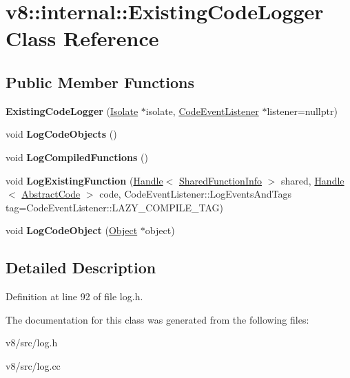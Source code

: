 \hypertarget{classv8_1_1internal_1_1ExistingCodeLogger}{}\section{v8\+:\+:internal\+:\+:Existing\+Code\+Logger Class Reference}
\label{classv8_1_1internal_1_1ExistingCodeLogger}
\subsection*{Public Member Functions}
\begin{DoxyCompactItemize}
\item 
\mbox{\label{classv8_1_1internal_1_1ExistingCodeLogger_a0eab384f0cb423738404a43ff8aeb2e1}} 
{\bfseries Existing\+Code\+Logger} (\mbox{\hyperlink{classv8_1_1internal_1_1Isolate}{Isolate}} $\ast$isolate, \mbox{\hyperlink{classv8_1_1internal_1_1CodeEventListener}{Code\+Event\+Listener}} $\ast$listener=nullptr)
\item 
\mbox{\label{classv8_1_1internal_1_1ExistingCodeLogger_a4f13827550df7915ea06d6f3f60297c3}} 
void {\bfseries Log\+Code\+Objects} ()
\item 
\mbox{\label{classv8_1_1internal_1_1ExistingCodeLogger_ad94e8c20095d9a31a39c855facba5915}} 
void {\bfseries Log\+Compiled\+Functions} ()
\item 
\mbox{\label{classv8_1_1internal_1_1ExistingCodeLogger_aff6921a11138603f3344f5a438f01eb9}} 
void {\bfseries Log\+Existing\+Function} (\mbox{\hyperlink{classv8_1_1internal_1_1Handle}{Handle}}$<$ \mbox{\hyperlink{classv8_1_1internal_1_1SharedFunctionInfo}{Shared\+Function\+Info}} $>$ shared, \mbox{\hyperlink{classv8_1_1internal_1_1Handle}{Handle}}$<$ \mbox{\hyperlink{classv8_1_1internal_1_1AbstractCode}{Abstract\+Code}} $>$ code, Code\+Event\+Listener\+::\+Log\+Events\+And\+Tags tag=Code\+Event\+Listener\+::\+L\+A\+Z\+Y\+\_\+\+C\+O\+M\+P\+I\+L\+E\+\_\+\+T\+AG)
\item 
\mbox{\label{classv8_1_1internal_1_1ExistingCodeLogger_ac6cdd364debc9f180f198f577548d629}} 
void {\bfseries Log\+Code\+Object} (\mbox{\hyperlink{classv8_1_1internal_1_1Object}{Object}} $\ast$object)
\end{DoxyCompactItemize}


\subsection{Detailed Description}


Definition at line 92 of file log.\+h.



The documentation for this class was generated from the following files\+:\begin{DoxyCompactItemize}
\item 
v8/src/log.\+h\item 
v8/src/log.\+cc\end{DoxyCompactItemize}
